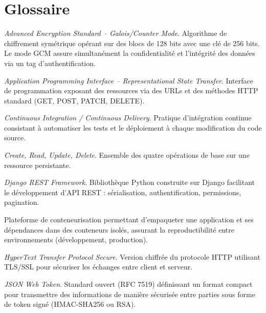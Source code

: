 \chapter*{Glossaire}

\begin{description}[leftmargin=3cm, labelwidth=2.5cm, font=\bfseries]

    \item[AES-256-GCM] \textit{Advanced Encryption Standard -- Galois/Counter Mode}.
    Algorithme de chiffrement symétrique opérant sur des blocs de 128 bits avec une clé
    de 256 bits. Le mode GCM assure simultanément la confidentialité et l'intégrité des
    données via un tag d'authentification.

    \item[API REST] \textit{Application Programming Interface -- Representational State Transfer}.
    Interface de programmation exposant des ressources via des URLs et des méthodes HTTP
    standard (GET, POST, PATCH, DELETE).

    \item[CI/CD] \textit{Continuous Integration / Continuous Delivery}.
    Pratique d'intégration continue consistant à automatiser les tests et
    le déploiement à chaque modification du code source.

    \item[CRUD] \textit{Create, Read, Update, Delete}.
    Ensemble des quatre opérations de base sur une ressource persistante.

    \item[DRF] \textit{Django REST Framework}.
    Bibliothèque Python construite sur Django facilitant le développement d'API REST :
    sérialisation, authentification, permissions, pagination.

    \item[Docker] Plateforme de conteneurisation permettant d'empaqueter une application
    et ses dépendances dans des conteneurs isolés, assurant la reproductibilité
    entre environnements (développement, production).

    \item[HTTPS] \textit{HyperText Transfer Protocol Secure}.
    Version chiffrée du protocole HTTP utilisant TLS/SSL pour sécuriser
    les échanges entre client et serveur.

    \item[JWT] \textit{JSON Web Token}.
    Standard ouvert (RFC 7519) définissant un format compact pour transmettre
    des informations de manière sécurisée entre parties sous forme de token signé
    (HMAC-SHA256 ou RSA).


\end{description}
